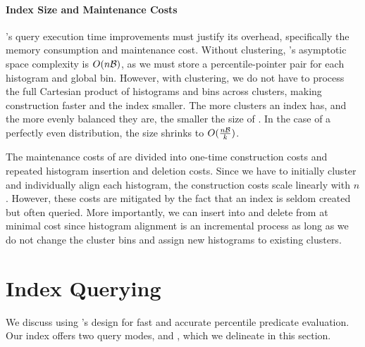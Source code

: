 \paragraph{Index Size and Maintenance Costs}
\system{}'s query execution time improvements must justify its overhead, specifically the memory consumption and maintenance cost.
Without clustering, \system{}'s asymptotic space complexity is $O(n \mathcal{B})$, as we must store a percentile-pointer pair for each histogram and global bin.
However, with clustering, we do not have to process the full Cartesian product of histograms and bins across clusters, making construction faster and the index smaller.
The more clusters an index has, and the more evenly balanced they are, the smaller the size of \system{}.
In the case of a perfectly even distribution, the size shrinks to $O(\frac{n \mathcal{B}}{k})$.

The maintenance costs of \system{} are divided into one-time construction costs and repeated histogram insertion and deletion costs.
Since we have to initially cluster and individually align each histogram, the construction costs scale linearly with $n$.
However, these costs are mitigated by the fact that an index is seldom created but often queried.
More importantly, we can insert into and delete from \system{} at minimal cost since histogram alignment is an incremental process as long as we do not change the cluster bins and assign new histograms to existing clusters.


\section{Index Querying}
\label{sec:index_querying}

We discuss using \system{}'s design for fast and accurate percentile predicate evaluation.
Our index offers two query modes, \approximate{} and \exact{}, which we delineate in this section.

\subsection{\approximate{}}
\label{sec:approx_query}

